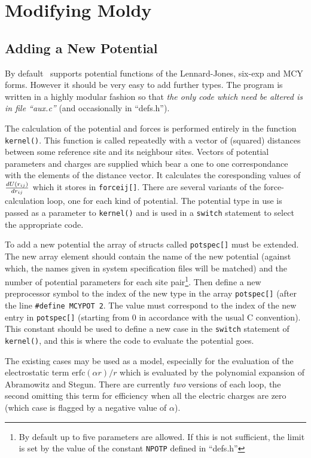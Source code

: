 \section{Modifying Moldy}
\subsection{Adding a New Potential}
\label{sec:newpot}
By default \moldy\  supports potential functions of the Lennard-Jones,
six-exp and MCY forms.  However it should be very easy to add further
types. The program is written in a highly modular fashion so that {\em
the only code which need be altered is in file ``aux.c''} (and
occasionally in ``defs.h''). 

The calculation of the potential and forces is performed entirely in
the function \verb'kernel()'.  This function is called repeatedly with
a vector of (squared) distances between some reference site and its
neighbour sites.  Vectors of potential parameters and charges are
supplied which bear a one to one correspondance with the elements of
the distance vector.  It calculates the coresponding values of
${dU(r_{ij})} \over {dr_{ij}}$ which it stores in \verb'forceij[]'.
There are several variants of the force-calculation loop, one for each
kind of potential.  The potential type in use is passed as a parameter
to \verb'kernel()' and is used in a \verb'switch' statement to select
the appropriate code. 

To add a new potential the array of structs called \verb'potspec[]'
must be extended.  The new array element should contain the name of
the new potential (against which, the names given in system
specification files will be matched) and the number of potential
parameters for each site pair\footnote{By default up to five
parameters are allowed. If this is not sufficient, the limit is set by
the value of the constant \verb'NPOTP' defined in ``defs.h''}.  Then
define a new preprocessor symbol to the index of the new type in the
array \verb'potspec[]' (after the line
\verb'#define'~\verb'MCYPOT'~\verb'2'.  The value must correspond to
the index of the new entry in \verb'potspec[]' (starting from 0 in
accordance with the usual C convention).  This constant should be used
to define a new case in the \verb'switch' statement of
\verb'kernel()', and this is where the code to evaluate the potential goes.

The  existing  cases  may  be  used as  a    model, especially for the
evaluation of the electrostatic term $\mbox{erfc}(\alpha r) / r$ which
is    evaluated  by  the   polynomial  expansion    of  Abramowitz and
Stegun\cite[section 7.1.26]{abramowitz:70}. There  are  currently {\em
two}   versions of each    loop,  the   second omitting this  term for
efficiency when  all the  electric  charges  are  zero  (which case is
flagged by a negative value of $\alpha$).

